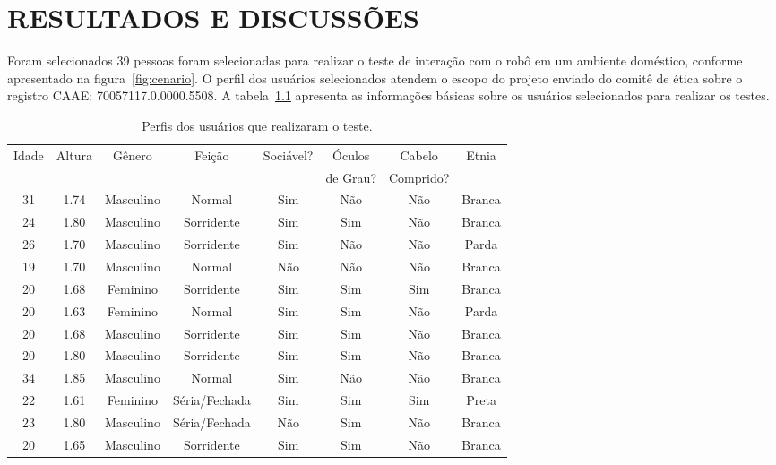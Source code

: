 \chapter{RESULTADOS E DISCUSSÕES}
\label{cap:resultados}
Foram selecionados 39 pessoas foram selecionadas para realizar o teste de interação com o robô em um ambiente doméstico, conforme apresentado na figura~\ref{fig:cenario}. O perfil dos usuários selecionados atendem o escopo do projeto enviado do comitê de ética sobre o registro CAAE: 70057117.0.0000.5508. A tabela~\ref{tab:perfilamostra} apresenta as informações básicas sobre os usuários selecionados para realizar os testes.

\begin{table}[!ht]
	\caption{Perfis dos usuários que realizaram o teste.}
	\label{tab:perfilamostra}
	\centering
	\begin{tabular}{c | c | c | c | c | c | c | c}
        \hline
        Idade & Altura & Gênero & Feição & Sociável? & Óculos & Cabelo & Etnia \\
         &  &  &  &  & de Grau? & Comprido? &  \\
        \hline
        31 & 1.74 & Masculino & Normal & Sim & Não & Não & Branca \\
        \hline
        24 & 1.80 & Masculino & Sorridente & Sim & Sim & Não & Branca \\
        \hline
        26 & 1.70 & Masculino & Sorridente & Sim & Não & Não & Parda \\
        \hline
        19 & 1.70 & Masculino & Normal & Não & Não & Não & Branca \\
        \hline
        20 & 1.68 & Feminino & Sorridente & Sim & Sim & Sim & Branca \\
        \hline
        20 & 1.63 & Feminino & Normal & Sim & Sim & Não & Parda \\
        \hline
        20 & 1.68 & Masculino & Sorridente & Sim & Sim & Não & Branca \\
        \hline
        20 & 1.80 & Masculino & Sorridente & Sim & Sim & Não & Branca \\
        \hline
        34 & 1.85 & Masculino & Normal & Sim & Não & Não & Branca \\
        \hline
        22 & 1.61 & Feminino & Séria/Fechada & Sim & Sim & Sim & Preta \\
        \hline
        23 & 1.80 & Masculino & Séria/Fechada & Não & Sim & Não & Branca \\
        \hline
        20 & 1.65 & Masculino & Sorridente & Sim & Sim & Não & Branca \\

\end{tabular}
\end{table}
